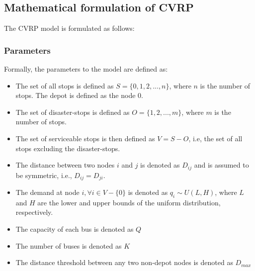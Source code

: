 \documentclass[12pt]{article}
\begin{document}
\subsection{Mathematical formulation of CVRP} \label{sec:cvrp}

The CVRP model is formulated as follows:
\subsubsection{Parameters}\label{sec:parameters}
Formally, the parameters to the model are defined as:
\begin{itemize}
    \item The set of all stops is defined as $S = \{0, 1, 2, ..., n\}$, where $n$ is the number of stops. The depot is defined as the node ${0}$.
    \item The set of disaster-stops is defined as $O = \{1, 2, ..., m\}$, where $m$ is the number of stops.
    \item The set of serviceable stops is then defined as $V = S - O$, i.e, the set of all stops excluding the disaster-stops.
    \item The distance between two nodes $i$ and $j$ is denoted as $D_{ij}$ and is assumed to be symmetric, i.e., $D_{ij} = D_{ji}$.
    \item The demand at node $i, \forall i \in V - \{0\}$ is denoted as $q_i \sim U(L, H)$,
          where $L$ and $H$ are the lower and upper bounds of the uniform distribution, respectively.
    \item The capacity of each bus is denoted as $Q$
    \item The number of buses is denoted as $K$
    \item The distance threshold between any two non-depot nodes is denoted as $D_{max}$

\end{itemize}
\end{document}
